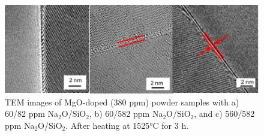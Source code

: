 \newpage
\begin{figure}[H]
	\centering
	\includegraphics[width=\textwidth]{Chapter-4/Figures/Figure12.png}
	\caption{TEM images of MgO-doped (380 ppm) powder samples with a) 60/82 ppm Na$_{2}$O/SiO$_{2}$, b) 60/582 ppm Na$_{2}$O/SiO$_{2}$, and c) 560/582 ppm Na$_{2}$O/SiO$_{2}$. After heating at 1525°C for 3 h.}
	\label{Ch4-figure:Figure12}
\end{figure}
